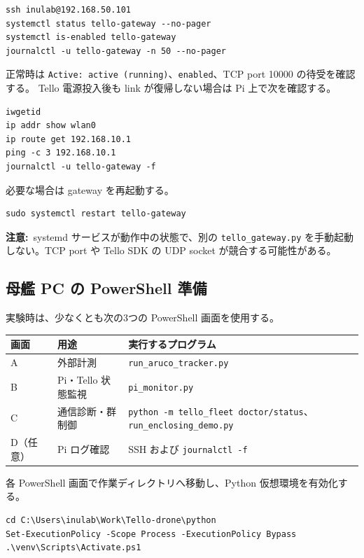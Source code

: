 \documentclass[11pt,a4paper]{ltjsarticle}
\newcommand{\code}[1]{\texttt{\small #1}}
\newcommand{\warning}[1]{\par\smallskip\noindent\textbf{注意:}~#1\par\smallskip}
\begin{document}
\begin{lstlisting}
ssh inulab@192.168.50.101
systemctl status tello-gateway --no-pager
systemctl is-enabled tello-gateway
journalctl -u tello-gateway -n 50 --no-pager
\end{lstlisting}

正常時は \code{Active: active (running)}、\code{enabled}、TCP port 10000 の待受を確認する。
Tello 電源投入後も link が復帰しない場合は Pi 上で次を確認する。

\begin{lstlisting}
iwgetid
ip addr show wlan0
ip route get 192.168.10.1
ping -c 3 192.168.10.1
journalctl -u tello-gateway -f
\end{lstlisting}

必要な場合は gateway を再起動する。

\begin{lstlisting}
sudo systemctl restart tello-gateway
\end{lstlisting}

\warning{systemd サービスが動作中の状態で、別の \code{tello\_gateway.py} を手動起動しない。TCP port や Tello SDK の UDP socket が競合する可能性がある。}

\subsection{母艦 PC の PowerShell 準備}

実験時は、少なくとも次の3つの PowerShell 画面を使用する。

\begin{longtable}{@{}p{2.0cm}p{4.3cm}p{7.9cm}@{}}
\toprule
\textbf{画面} & \textbf{用途} & \textbf{実行するプログラム} \\
\midrule
\endhead
A & 外部計測 & \code{run\_aruco\_tracker.py} \\
B & Pi・Tello 状態監視 & \code{pi\_monitor.py} \\
C & 通信診断・群制御 & \code{python -m tello\_fleet doctor/status}、\code{run\_enclosing\_demo.py} \\
D（任意） & Pi ログ確認 & SSH および \code{journalctl -f} \\
\bottomrule
\end{longtable}

各 PowerShell 画面で作業ディレクトリへ移動し、Python 仮想環境を有効化する。

\begin{lstlisting}
cd C:\Users\inulab\Work\Tello-drone\python
Set-ExecutionPolicy -Scope Process -ExecutionPolicy Bypass
.\venv\Scripts\Activate.ps1
\end{lstlisting}
\end{document}
